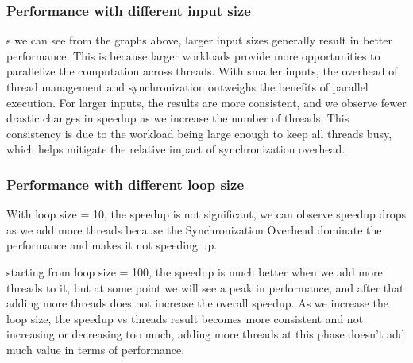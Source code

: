 \documentclass[letterpaper,12pt]{article}
\theoremstyle{remark}
\begin{document}
\subsubsection{Performance with different input size}
s we can see from the graphs above, larger input sizes generally result in better performance. 
This is because larger workloads provide more opportunities to parallelize the computation across threads. 
With smaller inputs, the overhead of thread management and synchronization outweighs the benefits of parallel execution. For larger inputs, the results are more consistent, and we observe fewer drastic changes in speedup as we increase the number of threads. This consistency is due to the workload being large enough to keep all threads busy, 
which helps mitigate the relative impact of synchronization overhead.

\subsubsection{Performance with different loop size}
With loop size = 10, the speedup is not significant, we can observe speedup drops as we add more threads because the Synchronization Overhead dominate the performance and makes it not speeding up.

starting from loop size = 100, the speedup is much better when we add more threads to it, but at some point we will see a peak in performance, and after that adding more threads does not increase the overall speedup.
As we increase the loop size, the speedup vs threads result becomes more consistent and not increasing or decreasing too much, adding more threads at this phase doesn't add much value in terms of performance.
\end{document}
